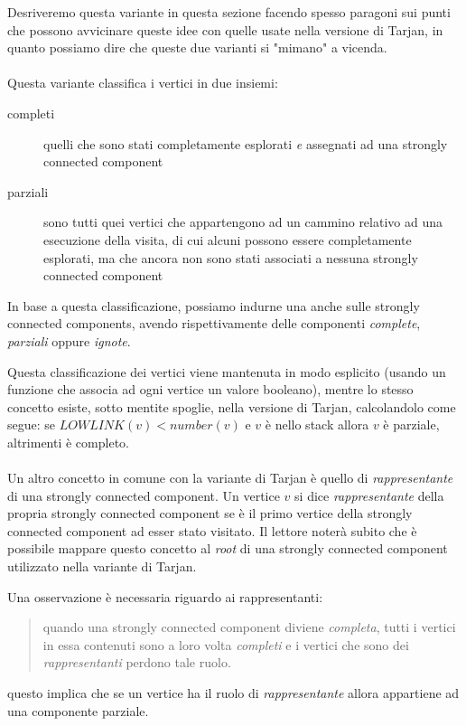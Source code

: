 Desriveremo questa variante in questa sezione facendo spesso paragoni
sui punti che possono avvicinare queste idee con quelle usate nella
versione di Tarjan, in quanto possiamo dire che queste due varianti si
"mimano" a vicenda.
\\\\
Questa variante classifica i vertici in due insiemi:
\begin{description}
\item[completi] quelli che sono stati completamente esplorati \emph{e}
  assegnati ad una strongly connected component
\item[parziali] sono tutti quei vertici che appartengono ad un cammino
  relativo ad una esecuzione della visita, di cui alcuni possono
  essere completamente esplorati, ma che ancora non sono stati
  associati a nessuna strongly connected component
\end{description}
In base a questa classificazione, possiamo indurne una anche sulle
strongly connected components, avendo rispettivamente delle componenti
\emph{complete}, \emph{parziali} oppure \emph{ignote}.

Questa classificazione dei vertici viene mantenuta in modo esplicito
(usando un funzione che associa ad ogni vertice un valore booleano),
mentre lo stesso concetto esiste, sotto mentite spoglie, nella
versione di Tarjan, calcolandolo come segue: se $LOWLINK(v) <
number(v)$ e $v$ \`e nello stack allora $v$ \`e parziale, altrimenti
\`e completo.
\\\\
Un altro concetto in comune con la variante di Tarjan \`e quello di
\emph{rappresentante} di una strongly connected component. Un vertice
$v$ si dice \emph{rappresentante} della propria strongly connected
component se \`e il primo vertice della strongly connected component
ad esser stato visitato. Il lettore noter\`a subito che \`e possibile
mappare questo concetto al \emph{root} di una strongly connected
component utilizzato nella variante di Tarjan.

Una osservazione \`e necessaria riguardo ai rappresentanti:
\begin{quotation}
  quando una strongly connected component diviene \emph{completa},
  tutti i vertici in essa contenuti sono a loro volta \emph{completi}
  e i vertici che sono dei \emph{rappresentanti} perdono tale ruolo.
\end{quotation}
questo implica che se un vertice ha il ruolo di \emph{rappresentante}
allora appartiene ad una componente parziale. 

